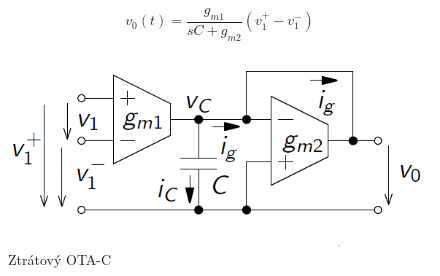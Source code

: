 \begin{equation}
v_0(t) = \frac{g_{m1}}{sC + g_{m2}}(v_1^+ - v_{1}^-)
\end{equation}
\begin{figure}[h]
\centering
\includegraphics[scale=0.5]{damp.png}
\caption[Ztrátový OTA-C]{Ztrátový OTA-C \cite{5}}
\end{figure}
